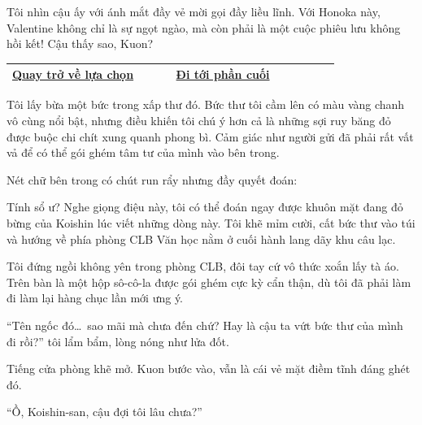 \documentclass[../main.tex]{subfiles}
\begin{document}
Tôi nhìn cậu ấy với ánh mắt đầy vẻ mời gọi đầy liều lĩnh. Với Honoka này, Valentine không chỉ là sự ngọt ngào, mà còn phải là một cuộc phiêu lưu không hồi kết! Cậu thấy sao, Kuon?

\begin{table}[H]
  \centering
  \setlength{\arrayrulewidth}{1pt}
  \begin{tabular}{|>{\centering\arraybackslash}p{0.4\linewidth}|>{\centering\arraybackslash}p{0.4\linewidth}|}
    \hline
    \hyperref[choice]{Quay trở về lựa chọn} & \hyperref[ending]{Đi tới phần cuối} \\ \hline
  \end{tabular}
\end{table}

\newpage
\label{koishin}

Tôi lấy bừa một bức trong xấp thư đó. Bức thư tôi cầm lên có màu vàng chanh vô cùng nổi bật, nhưng điều khiến tôi chú ý hơn cả là những sợi ruy băng đỏ được buộc chi chít xung quanh phong bì. Cảm giác như người gửi đã phải rất vất vả để có thể gói ghém tâm tư của mình vào bên trong.

Nét chữ bên trong có chút run rẩy nhưng đầy quyết đoán:


Tính sổ ư? Nghe giọng điệu này, tôi có thể đoán ngay được khuôn mặt đang đỏ bừng của Koishin lúc viết những dòng này. Tôi khẽ mỉm cười, cất bức thư vào túi và hướng về phía phòng CLB Văn học nằm ở cuối hành lang dãy khu câu lạc.

\ct


Tôi đứng ngồi không yên trong phòng CLB, đôi tay cứ vô thức xoắn lấy tà áo. Trên bàn là một hộp sô-cô-la được gói ghém cực kỳ cẩn thận, dù tôi đã phải làm đi làm lại hàng chục lần mới ưng ý.

``Tên ngốc đó\dots\ sao mãi mà chưa đến chứ? Hay là cậu ta vứt bức thư của mình đi rồi?'' tôi lẩm bẩm, lòng nóng như lửa đốt.

Tiếng cửa phòng khẽ mở. Kuon bước vào, vẫn là cái vẻ mặt điềm tĩnh đáng ghét đó.

``Ồ, Koishin-san, cậu đợi tôi lâu chưa?''
\end{document}
